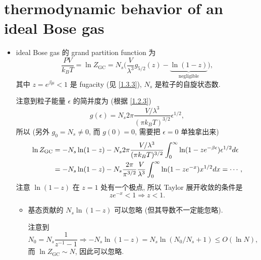 \section{thermodynamic behavior of an ideal Bose gas} \label{7.1}
\begin{itemize}
	\item ideal Bose gas 的 grand partition function 为
	\begin{equation} \label{7.1.1}
		\frac{P V}{k_B T} = \ln Z_\text{GC} = N_s \Big( \frac{V}{\lambda^3} g_{5 / 2}(z) - \underbrace{\ln(1 - z)}_{\text{negligible}} \Big),
	\end{equation}
	其中 $z = e^{\beta \mu} < 1$ 是 fugacity (见 \eqref{1.3.3}), $N_s$ 是粒子的自旋状态数.
	
	\begin{tcolorbox}[title=calculation:]
		注意到粒子能量 $\epsilon$ 的简并度为 (根据 \eqref{1.2.3})
		\begin{equation} \label{7.1.2}
			g(\epsilon) = N_s 2 \pi \frac{V / \lambda^3}{(\pi k_B T)^{3 / 2}} \epsilon^{1 / 2},
		\end{equation}
		所以 (另外 $g_0 = N_s \neq 0$, 而 $g(0) = 0$, 需要把 $\epsilon = 0$ 单独拿出来)
		\begin{align}
			\ln Z_\text{GC} &= - N_s \ln(1 - z) - N_s 2 \pi \frac{V / \lambda^3}{(\pi k_B T)^{3 / 2}} \int_0^\infty \ln(1 - z e^{- \beta \epsilon}) \epsilon^{1 / 2} d\epsilon \notag \\
			&= - N_s \ln(1 - z) - N_s \frac{2 \pi}{\pi^{3 / 2}} \frac{V}{\lambda^3} \int_0^\infty \ln(1 - z e^{- x}) x^{1 / 2} dx = \cdots,
		\end{align}
		注意 $\ln(1 - z)$ 在 $z = 1$ 处有一个极点, 所以 Taylor 展开收敛的条件是
		\begin{equation} \label{7.1.4}
			z e^{- x} < 1 \Longrightarrow z < 1.
		\end{equation}
	\end{tcolorbox}
	
	\begin{itemize}
		\item 基态贡献的 $N_s \ln(1 - z)$ 可以忽略 (但其导数不一定能忽略).
		
		\begin{tcolorbox}[title=proof:]
			注意到
			\begin{equation}
				N_0 = N_s \frac{1}{z^{- 1} - 1} \Longrightarrow - N_s \ln(1 - z) = N_s \ln(N_0 / N_s + 1) \leq O(\ln N),
			\end{equation}
			而 $\ln Z_\text{GC} \sim N$, 因此可以忽略.
		\end{tcolorbox}
	\end{itemize}
	

\end{itemize}
